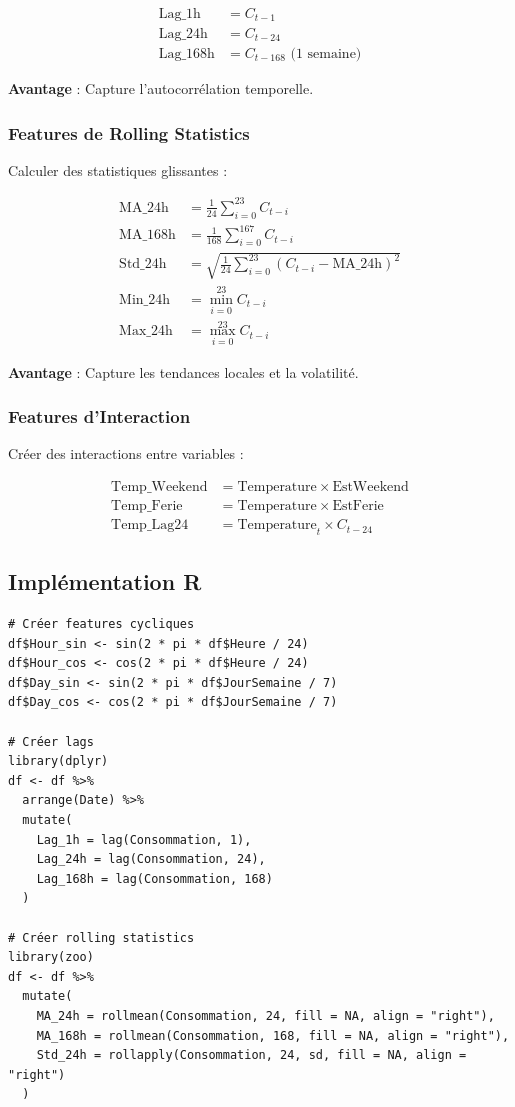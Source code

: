 \documentclass[12pt,a4paper]{article}
\begin{document}
\begin{align}
    \text{Lag\_1h} &= C_{t-1} \\
    \text{Lag\_24h} &= C_{t-24} \\
    \text{Lag\_168h} &= C_{t-168} \text{ (1 semaine)}
\end{align}

\textbf{Avantage} : Capture l'autocorrélation temporelle.

\subsubsection{Features de Rolling Statistics}

Calculer des statistiques glissantes :

\begin{align}
    \text{MA\_24h} &= \frac{1}{24}\sum_{i=0}^{23} C_{t-i} \\
    \text{MA\_168h} &= \frac{1}{168}\sum_{i=0}^{167} C_{t-i} \\
    \text{Std\_24h} &= \sqrt{\frac{1}{24}\sum_{i=0}^{23}(C_{t-i} - \text{MA\_24h})^2} \\
    \text{Min\_24h} &= \min_{i=0}^{23} C_{t-i} \\
    \text{Max\_24h} &= \max_{i=0}^{23} C_{t-i}
\end{align}

\textbf{Avantage} : Capture les tendances locales et la volatilité.

\subsubsection{Features d'Interaction}

Créer des interactions entre variables :

\begin{align}
    \text{Temp\_Weekend} &= \text{Temperature} \times \text{EstWeekend} \\
    \text{Temp\_Ferie} &= \text{Temperature} \times \text{EstFerie} \\
    \text{Temp\_Lag24} &= \text{Temperature}_t \times C_{t-24}
\end{align}

\subsection{Implémentation R}

\begin{verbatim}
# Créer features cycliques
df$Hour_sin <- sin(2 * pi * df$Heure / 24)
df$Hour_cos <- cos(2 * pi * df$Heure / 24)
df$Day_sin <- sin(2 * pi * df$JourSemaine / 7)
df$Day_cos <- cos(2 * pi * df$JourSemaine / 7)

# Créer lags
library(dplyr)
df <- df %>%
  arrange(Date) %>%
  mutate(
    Lag_1h = lag(Consommation, 1),
    Lag_24h = lag(Consommation, 24),
    Lag_168h = lag(Consommation, 168)
  )

# Créer rolling statistics
library(zoo)
df <- df %>%
  mutate(
    MA_24h = rollmean(Consommation, 24, fill = NA, align = "right"),
    MA_168h = rollmean(Consommation, 168, fill = NA, align = "right"),
    Std_24h = rollapply(Consommation, 24, sd, fill = NA, align = "right")
  )
\end{verbatim}
\end{document}
